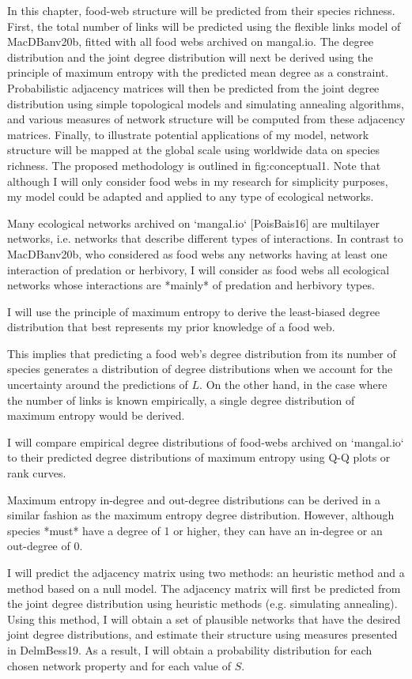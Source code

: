 In this chapter, food-web structure will be predicted from their species
richness. First, the total number of links will be predicted using the flexible
links model of MacDBanv20b, fitted with all food webs archived on
mangal.io. The degree distribution and the joint
degree distribution will next be derived using the principle of maximum entropy
with the predicted mean degree as a constraint. Probabilistic adjacency matrices
will then be predicted from the joint degree distribution using simple
topological models and simulating annealing algorithms, and various measures of
network structure will be computed from these adjacency matrices. Finally, to
illustrate potential applications of my model, network structure will be mapped
at the global scale using worldwide data on species richness. The proposed
methodology is outlined in fig:conceptual1. Note that although I will only
consider food webs in my research for simplicity purposes, my model could be
adapted and applied to any type of ecological networks.

Many ecological
networks archived on `mangal.io` [PoisBais16] are multilayer networks, i.e. networks that
describe different types of interactions. In contrast to MacDBanv20b, who
considered as food webs any networks having at least one interaction of
predation or herbivory, I will consider as food webs all ecological networks
whose interactions are *mainly* of predation and herbivory types. 

I will use the principle of maximum entropy to derive the least-biased degree
distribution that best represents my prior knowledge of a food web. 

This implies that predicting a food web's degree
distribution from its number of species generates a distribution of degree
distributions when we account for the uncertainty around the predictions of $L$.
On the other hand, in the case where the number of links is known empirically, a
single degree distribution of maximum entropy would be derived. 

I will compare empirical degree distributions of food-webs archived on
`mangal.io` to their predicted degree distributions of maximum entropy using Q-Q
plots or rank curves.

Maximum entropy in-degree and out-degree distributions can be derived in a
similar fashion as the maximum entropy degree distribution. However, although
species *must* have a degree of 1 or higher, they can have an in-degree or an
out-degree of 0. 

I will predict the adjacency matrix using two methods: an heuristic method and a
method based on a null model. The adjacency matrix will first be predicted from
the joint degree distribution using heuristic methods (e.g. simulating
annealing). Using this method, I will obtain a set of plausible networks that
have the desired joint degree distributions, and estimate their structure using
measures presented in DelmBess19. As a result, I will obtain a probability
distribution for each chosen network property and for each value of $S$.

